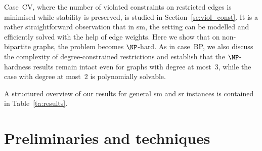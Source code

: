 \documentclass[preprint,12pt]{elsarticle}
\begin{document}
Case~CV, where the number of violated constraints on restricted edges is minimised while stability is preserved, is studied in Section~\ref{se:viol_const}. It is a rather straightforward observation that in {\sc sm}, the setting can be modelled and efficiently solved with the help of edge weights. Here we show that on non-bipartite graphs, the problem becomes $\NP$-hard. As in case~BP, we also discuss the complexity of degree-constrained restrictions and establish that the $\NP$-hardness results remain intact even for graphs with degree at most~3, while the case with degree at most~2 is polynomially solvable.

A structured overview of our results for general {\sc sm} and {\sc sr} instances is contained in Table~\ref{ta:results}. 
\begin{table}[ht]
	\centering
    \newline
\caption{Summary of results}
\label{ta:results}
\end{table}

\section{Preliminaries and techniques}
\label{se:preliminaries}
\end{document}
